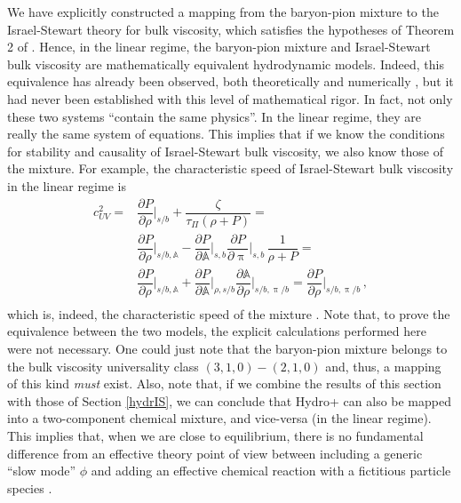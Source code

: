 \documentclass[a4paper, amsfonts, amssymb, amsmath, reprint, showkeys, nofootinbib, twoside, onecolumn,notitlepage]{revtex4-1}
\begin{document}
We have explicitly constructed a mapping from the baryon-pion mixture to the Israel-Stewart theory for bulk viscosity, which satisfies the hypotheses of Theorem 2 of \cite{paperI}. Hence, in the linear regime, the baryon-pion mixture and Israel-Stewart bulk viscosity are mathematically equivalent hydrodynamic models. Indeed, this equivalence has already been observed, both theoretically \cite{BulkGavassino,GavassinoRadiazione,Camelio2022} and numerically \cite{CamelioSimulations2022}, but it had never been established with this level of mathematical rigor. In fact, not only these two systems ``contain the same physics''. In the linear regime, they are really the same system of equations. This implies that if we know the conditions for stability and causality of Israel-Stewart bulk viscosity, we also know those of the mixture. For example, the characteristic speed of Israel-Stewart bulk viscosity in the linear regime is \cite{Causality_bulk}
\begin{equation}
\begin{split}
c_{UV}^2 ={}& \dfrac{\partial P}{\partial \rho} \bigg|_{s/b} \!\! + \dfrac{\zeta}{\tau_\Pi (\rho+P)} = \\
& \dfrac{\partial P}{\partial \rho} \bigg|_{s/b,\mathbb{A}} \!\! \!\! -  \dfrac{\partial P}{\partial \mathbb{A}}\bigg|_{s,b} \dfrac{\partial P}{\partial \uppi}\bigg|_{s,b} \, \dfrac{1}{\rho+P} = \\
& \dfrac{\partial P}{\partial \rho} \bigg|_{s/b,\mathbb{A}} \!\! \!\! +  \dfrac{\partial P}{\partial \mathbb{A}}\bigg|_{\rho,s/b} \dfrac{\partial \mathbb{A}}{\partial \rho}\bigg|_{s/b,\uppi/b} \!\!= \dfrac{\partial P}{\partial \rho}\bigg|_{s/b,\uppi/b} \, , \\
\end{split}
\end{equation}
which is, indeed, the characteristic speed of the mixture \cite{Camelio2022}. Note that, to prove the equivalence between the two models, the explicit calculations performed here were not necessary. One could just note that the baryon-pion mixture belongs to the bulk viscosity universality class $(3,1,0)-(2,1,0)$ and, thus, a mapping of this kind \textit{must} exist. Also, note that, if we combine the results of this section with those of Section \ref{hydrIS}, we can conclude that Hydro+ can also be mapped into a two-component chemical mixture, and vice-versa (in the linear regime). This implies that, when we are close to equilibrium, there is no fundamental difference from an effective theory point of view between including a generic ``slow mode'' $\phi$ and adding an effective chemical reaction with a fictitious particle species \cite{BulkGavassino}.
\end{document}
